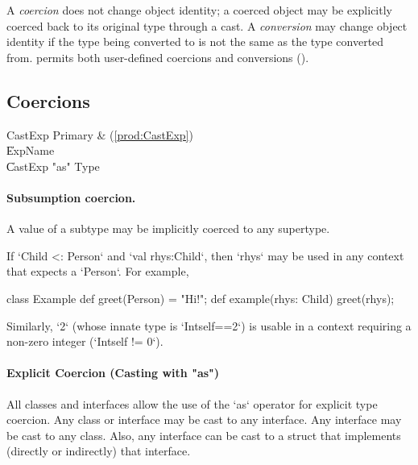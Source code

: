 A {\em coercion} does not change object identity; a coerced object may
be explicitly coerced back to its original type through a cast. A {\em
  conversion} may change object identity if the type being converted
to is not the same as the type converted from. \Xten{} permits both 
user-defined coercions and conversions ().


\subsection{Coercions}

\begin{bbgrammar}
             CastExp \: Primary & (\ref{prod:CastExp}) \\
                    \| ExpName \\
                    \| CastExp \xcd"as" Type \\
\end{bbgrammar}


\paragraph{Subsumption coercion.}
A value of a subtype may be implicitly coerced to any supertype.  

\begin{ex}
If \xcd`Child <: Person` and \xcd`val rhys:Child`, then \xcd`rhys` may be used
in any context that expects a \xcd`Person`.  For example, 
\begin{xten}
class Example {
  def greet(Person) = "Hi!";
  def example(rhys: Child) {
     greet(rhys);
  }
}
\end{xten}
%

Similarly, \xcd`2` (whose innate type is \xcd`Int{self==2}`)
is usable in a context requiring a non-zero integer
(\xcd`Int{self != 0}`).  
\end{ex}

\paragraph{Explicit Coercion (Casting with \xcd"as")}

All classes and interfaces allow the use of the \xcd`as` operator for explicit
type coercion.  
Any class or
interface may be cast to any interface.  
Any interface may be cast to
any class.  Also, any interface can be cast to a struct that implements
(directly or indirectly) that interface.


